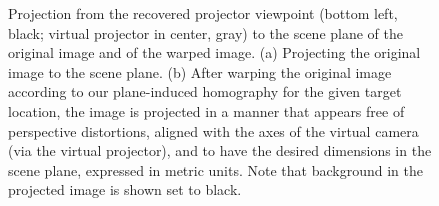 \documentclass[review]{elsarticle}
\begin{document}
\begin{figure}
    \centering
    \qquad
    \caption{Projection from the recovered projector viewpoint (bottom left, black; virtual projector in center, gray) to the scene plane of the original image and of the warped image. (a) Projecting the original image to the scene plane. (b) After warping the original image according to our plane-induced homography for the given target location, the image is projected in a manner that appears free of perspective distortions, aligned with the axes of the virtual camera (via the virtual projector), and to have the desired dimensions in the scene plane, expressed in metric units. Note that background in the projected image is shown set to black.}
    \label{fig:warp}
\end{figure}
\end{document}
